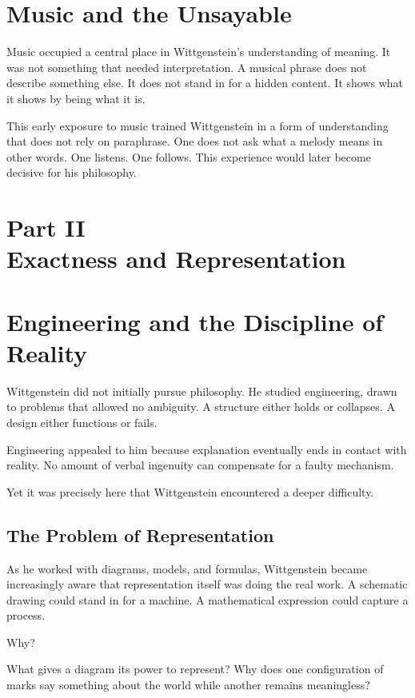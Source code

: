 \documentclass[11pt]{article}
\begin{document}
\section*{Music and the Unsayable}

Music occupied a central place in Wittgenstein’s understanding of meaning. It was not something that needed interpretation. A musical phrase does not describe something else. It does not stand in for a hidden content. It shows what it shows by being what it is.

This early exposure to music trained Wittgenstein in a form of understanding that does not rely on paraphrase. One does not ask what a melody means in other words. One listens. One follows. This experience would later become decisive for his philosophy.

\newpage
\section*{Part II \\ Exactness and Representation}

\section*{Engineering and the Discipline of Reality}

Wittgenstein did not initially pursue philosophy. He studied engineering, drawn to problems that allowed no ambiguity. A structure either holds or collapses. A design either functions or fails.

Engineering appealed to him because explanation eventually ends in contact with reality. No amount of verbal ingenuity can compensate for a faulty mechanism.

Yet it was precisely here that Wittgenstein encountered a deeper difficulty.

\subsection*{The Problem of Representation}

As he worked with diagrams, models, and formulas, Wittgenstein became increasingly aware that representation itself was doing the real work. A schematic drawing could stand in for a machine. A mathematical expression could capture a process.

Why?

What gives a diagram its power to represent? Why does one configuration of marks say something about the world while another remains meaningless?
\end{document}
